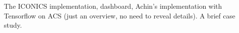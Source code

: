 \begin{todo}
  The ICONICS implementation, dashboard, Achin's implementation with Tensorflow on ACS (just an overview, no need to reveal details).
  A brief case study.
\end{todo}


